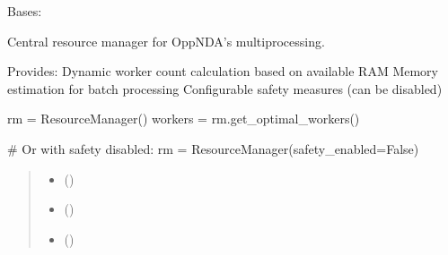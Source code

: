 \documentclass[a4paper,11pt,english,openany,oneside]{sphinxmanual}
\begin{document}
\begin{fulllineitems}
\label{\detokenize{modules/core:core.resource_manager.ResourceManager}}
\pysigstartsignatures
\pysiglinewithargsret
{}
{\sphinxparamcomma {}\sphinxparamcomma {}\sphinxparamcomma {}}
{}
\pysigstopsignatures
\sphinxAtStartPar
Bases: 

\sphinxAtStartPar
Central resource manager for OppNDA’s multiprocessing.

\sphinxAtStartPar
Provides:
\sphinxhyphen{} Dynamic worker count calculation based on available RAM
\sphinxhyphen{} Memory estimation for batch processing
\sphinxhyphen{} Configurable safety measures (can be disabled)
\begin{description}
\sphinxAtStartPar
rm = ResourceManager()
workers = rm.get\_optimal\_workers()

\sphinxAtStartPar
\# Or with safety disabled:
rm = ResourceManager(safety\_enabled=False)

\end{description}
\begin{quote}\begin{description}
\begin{itemize}
\item {} 
\sphinxAtStartPar
{} ()

\item {} 
\sphinxAtStartPar
{} ()

\item {} 
\sphinxAtStartPar
{} ()


\end{itemize}
\end{description}
\end{quote}
\end{fulllineitems}
\end{document}
